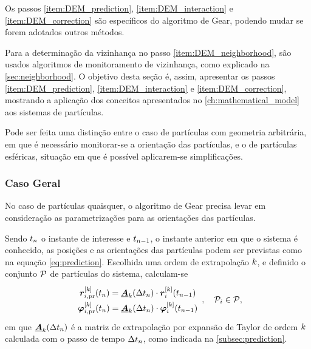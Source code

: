 Os passos \ref{item:DEM_prediction}, \ref{item:DEM_interaction} e \ref{item:DEM_correction} são específicos do algoritmo de Gear, podendo mudar se forem adotados outros métodos.

Para a determinação da vizinhança no passo \ref{item:DEM_neighborhood}, são usados algoritmos de monitoramento de vizinhança, como explicado na \autoref{sec:neighborhood}. O objetivo desta seção é, assim, apresentar os passos \ref{item:DEM_prediction}, \ref{item:DEM_interaction} e \ref{item:DEM_correction}, mostrando a aplicação dos conceitos apresentados no \autoref{ch:mathematical_model} aos sistemas de partículas.


Pode ser feita uma distinção entre o caso de partículas com geometria arbitrária, em que é necessário monitorar-se a orientação das partículas, e o de partículas esféricas, situação em que é possível aplicarem-se simplificações.

\subsubsection*{Caso Geral}

No caso de partículas quaisquer, o algoritmo de Gear precisa levar em consideração as parametrizações para as orientações das partículas.

Sendo \(\instant[n]\) o instante de interesse e \(\instant[n-1]\), o instante anterior em que o sistema é conhecido, as posições e as orientações das partículas podem ser previstas como na equação \eqref{eq:prediction}. Escolhida uma ordem de extrapolação \(\taylorOrder\), e definido o conjunto \(\particleSet\) de partículas do sistema, calculam-se
\begin{equation*}
	\def\arraystretch{1.5}
	\begin{array}{c}
		\drvec{\taylorOrder}{\positionipr}\pqty{\instant[n]} = \extrapolationMatrix{\taylorOrder}[\Dt[n]]\cdot\drvec{\taylorOrder}{\positioni}\pqty{\instant[n-1]} \\
		\drvec{\taylorOrder}{\orientationipr}\pqty{\instant[n]} = \extrapolationMatrix{\taylorOrder}[\Dt[n]]\cdot\drvec{\taylorOrder}{\orientationi}\pqty{\instant[n-1]} \\
	\end{array}, \quad \particlei \in \particleSet,
\end{equation*}
em que \(\extrapolationMatrix{\taylorOrder}[\Dt[n]]\) é a matriz de extrapolação por expansão de Taylor de ordem \(\taylorOrder\) calculada com o passo de tempo \(\Dt[n]\), como indicada na \autoref{subsec:prediction}.

